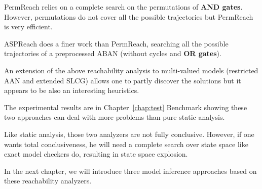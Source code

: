 PermReach relies on a complete search on the permutations of \textbf{AND gates}.
However, permutations do not cover all the possible trajectories but PermReach is very efficient.

ASPReach does a finer work than PermReach, searching all the possible trajectories of a preprocessed ABAN (without cycles and \textbf{OR gates}).

An extension of the above reachability analysis to multi-valued models (restricted AAN and extended SLCG) allows one to partly discover the solutions but it appears to be also an interesting heuristics. 

The experimental results are in Chapter~\ref{chap:test} Benchmark showing these two approaches can deal with more problems than pure static analysis.

Like static analysis, those two analyzers are not fully conclusive.
However, if one wants total conclusiveness, he will  need a complete search over state space like exact model checkers do, resulting in state space explosion.

In the next chapter, we will introduce three model inference approaches based on these reachability analyzers.